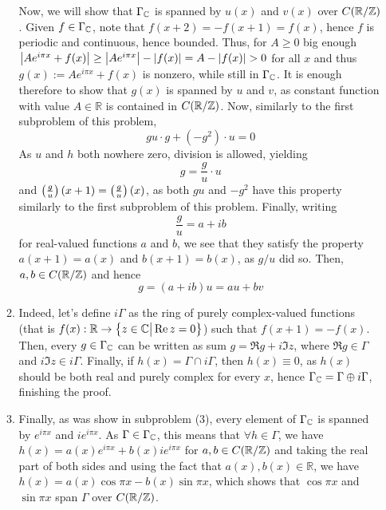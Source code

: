 \documentclass[8pt,fleqn]{article} %
\begin{document}
\begin{enumerate}[label=\bfseries Problem \arabic*.]
\begin{enumerate}[label=(\arabic*).]
				Now, we will show that $\Gamma_{\mathbb{C}}$ is spanned by $u(x)$ and $v(x)$ over $C(\mathbb{R}/\mathbb{Z})$. Given $f\in\Gamma_{\mathbb{C}}$, note that
				$f(x+2)=-f(x+1)=f(x)$, hence $f$ is periodic and continuous, hence bounded. Thus, for $A\geq 0$
				big enough $\myabs{Ae^{i\pi x}+f(x)}\geq \myabs{Ae^{i\pi x}}-\myabs{f(x)}=A-\myabs{f(x)}>0$ for
				all $x$ and thus $g(x):=Ae^{i\pi x}+f(x)$ is nonzero, while still in $\Gamma_{\mathbb{C}}$. It is enough therefore
				to show that $g(x)$ is spanned by $u$ and $v$, as constant function with value
				$A\in\mathbb{R}$ is contained in $C(\mathbb{R}/\mathbb{Z})$. Now, similarly to the first subproblem of this
				problem, 
				\[gu\cdot g+(-g^2)\cdot u=0\]
				As $u$ and $h$ both nowhere zero, division is allowed, yielding
				\[g=\frac{g}{u}\cdot u\]
				and $\left(\frac{g}{u}\right)(x+1)=\left(\frac{g}{u}\right)(x)$, as both $gu$ and $-g^2$ have this property
				similarly to the first subproblem of this problem. Finally, writing 
				\[\frac{g}{u}=a+ib\]
				for real-valued functions $a$ and $b$, we see that they satisfy the property $a(x+1)=a(x)$ and $b(x+1)
				=b(x)$, as $g/u$ did so. Then, $a,b\in C(\mathbb{R}/\mathbb{Z})$ and hence
				\[g=(a+ib)u=au+bv\]
			\item Indeed, let's define $i\Gamma$ as the ring of purely complex-valued functions (that is $f(x):\mathbb{R}
				\to\left\{z\in\mathbb{C}\big| \operatorname{Re} z=0\right\}$) such that $f(x+1)=-f(x)$. Then, every $g\in\Gamma_{\mathbb{C}}$ can be written
				as sum $g=\Re g+i\Im z$, where $\Re g\in\Gamma$ and $i\Im z\in i\Gamma$. Finally,
				if $h(x)=\Gamma\cap i\Gamma$, then $h(x)\equiv0$, as $h(x)$ should be both real and purely complex
				for every $x$, hence $\Gamma_{\mathbb{C}}=\Gamma\oplus i\Gamma$, finishing the proof.
			\item Finally, as was show in subproblem (3), every element of $\Gamma_{\mathbb{C}}$ is spanned by $e^{i\pi x}$
				and $ie^{i\pi x}$. As $\Gamma\in\Gamma_{\mathbb{C}}$, this means that $\forall h\in\Gamma$, we have
				$h(x)=a(x)e^{i\pi x}+b(x)ie^{i\pi x}$ for $a,b\in C(\mathbb{R}/\mathbb{Z})$ and taking the real part of both sides
				and using the fact that $a(x),b(x)\in\mathbb{R}$, we have $h(x)=a(x)\cos\pi x-b(x)\sin \pi x$,
				which shows that $\cos\pi x$ and $\sin\pi x$ span $\Gamma$ over $C(\mathbb{R}/\mathbb{Z})$.
		\end{enumerate}
\end{enumerate}
\end{document}
